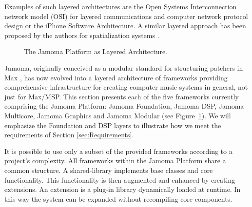 \documentclass[twoside,10pt]{article}
\begin{document}
Examples of such layered architectures are the Open Systems Interconnection network model (OSI) \cite{web6} 
for layered communications and computer network protocol design or the iPhone Software Architecture. A similar layered approach has been proposed by the authors for spatialization systems \cite{Peters:2009}. 

\begin{figure}[htbp]
\centerline{}
\caption{The Jamoma Platform as Layered Architecture.}
\label{fig:layers}
\end{figure}

Jamoma, originally conceived as a modular standard for structuring patchers in Max \cite{Place:2006}, has now evolved into a layered architecture of frameworks providing comprehensive infrastructure for creating computer music systems in general, not just for Max/MSP.  This section presents each of the five frameworks currently comprising the Jamoma Platform: Jamoma Foundation, Jamoma DSP, Jamoma Multicore, Jamoma Graphics and Jamoma Modular (see Figure~\ref{fig:layers}).  We will emphasize the Foundation and DSP layers to illustrate how we meet the requirements of Section \ref{sec:Requirements}.
 
  
It is possible to use only a subset of the provided frameworks according to a project's complexity. 
All frameworks within the Jamoma Platform share a common structure.  A shared-library implements base classes and core functionality.  This functionality is then augmented and enhanced by creating extensions.  An extension is a plug-in library dynamically loaded at runtime.  In this way the system can be expanded without recompiling core components.
\end{document}
